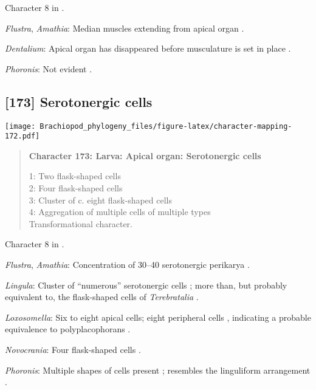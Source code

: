 \documentclass[openany]{book}
\theoremstyle{definition}
\theoremstyle{definition}
\theoremstyle{definition}
\theoremstyle{remark}
\begin{document}
Character 8 in \citet{Vinther2008}.

\hypertarget{Amathia-coding-172}{}
\emph{Flustra}, \emph{Amathia}: Median muscles extending from apical
organ \citep{Gruhl2008}.

\hypertarget{Dentalium-coding-172}{}
\emph{Dentalium}: Apical organ has disappeared before musculature is set
in place \citep{Wanninger2002M}.

\hypertarget{Phoronis-coding-172}{}
\emph{Phoronis}: Not evident \citep[fig. 2C]{Santagata2004}.

\subsection*{{[}173{]} Serotonergic cells}\label{serotonergic-cells}

\texttt{[image: Brachiopod\_phylogeny\_files/figure-latex/character-mapping-172.pdf]}

\begin{quote}
\textbf{Character 173: Larva: Apical organ: Serotonergic cells}

1: Two flask-shaped cells\\
2: Four flask-shaped cells\\
3: Cluster of c. eight flask-shaped cells\\
4: Aggregation of multiple cells of multiple types\\
Transformational character.
\end{quote}

Character 8 in \citet{Haszprunar2008}.

\hypertarget{Amathia-coding-173}{}
\emph{Flustra}, \emph{Amathia}: Concentration of 30--40 serotonergic
perikarya \citep[in \emph{Fredericella};][]{Gruhl2010F}.

\hypertarget{Lingula-coding-173}{}
\emph{Lingula}: Cluster of ``numerous'' serotonergic cells
\citep{HaySchmidt1992, Altenburger2010}; more than, but probably
equivalent to, the flask-shaped cells of \emph{Terebratalia}
\citep{Luter2016}.

\hypertarget{Loxosomella-coding-173}{}
\emph{Loxosomella}: Six to eight apical cells; eight peripheral cells
\citep{Wanninger2007}, indicating a probable equivalence to
polyplacophorans \citep{Haszprunar2008}.

\hypertarget{Novocrania-coding-173}{}
\emph{Novocrania}: Four flask-shaped cells \citep{Altenburger2010}.

\hypertarget{Phoronis-coding-173}{}
\emph{Phoronis}: Multiple shapes of cells present \citep{Santagata2002};
resembles the linguliform arrangement \citep{Altenburger2010}.
\end{document}
